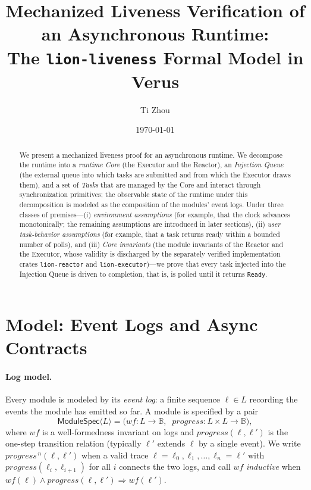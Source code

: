 \documentclass[11pt]{article}
\title{Mechanized Liveness Verification of an Asynchronous Runtime:\\
       The \texttt{lion-liveness} Formal Model in Verus}
\author{Ti Zhou}
\date{\today}
\theoremstyle{plain}
\theoremstyle{definition}
\begin{document}
\maketitle

\begin{abstract}
We present a mechanized liveness proof for an asynchronous runtime. We decompose
the runtime into a \emph{runtime Core} (the Executor and the Reactor), an
\emph{Injection Queue} (the external queue into which tasks are submitted and from
which the Executor draws them), and a set of \emph{Tasks} that are managed by the
Core and interact through synchronization primitives; the observable state of the
runtime under this decomposition is modeled as the composition of the modules'
event logs. Under three classes of premises---(i) \emph{environment assumptions}
(for example, that the clock advances monotonically; the remaining assumptions are
introduced in later sections), (ii) \emph{user task-behavior assumptions} (for
example, that a task returns ready within a bounded number of polls), and (iii)
\emph{Core invariants} (the module invariants of the Reactor and the Executor,
whose validity is discharged by the separately verified implementation crates
\texttt{lion-reactor} and \texttt{lion-executor})---we prove that every task
injected into the Injection Queue is driven to completion, that is, is polled
until it returns \texttt{Ready}.
\end{abstract}

\tableofcontents
\bigskip


\section{Model: Event Logs and Async Contracts}
\label{sec:model}

\paragraph{Log model.}
Every module is modeled by its \emph{event log}: a finite sequence $\ell \in L$
recording the events the module has emitted so far. A module is specified by a pair
\[
  \mathsf{ModuleSpec}\langle L\rangle
  = \bigl(\mathit{wf} : L \to \mathbb{B},\;\; \mathit{progress} : L \times L \to \mathbb{B}\bigr),
\]
where $\mathit{wf}$ is a well-formedness invariant on logs and $\mathit{progress}(\ell,\ell')$
is the one-step transition relation (typically $\ell'$ extends $\ell$ by a single event).
We write $\mathit{progress}^{\,n}(\ell,\ell')$ when a valid trace
$\ell = \ell_0, \ell_1, \dots, \ell_n = \ell'$ with $\mathit{progress}(\ell_i,\ell_{i+1})$ for
all $i$ connects the two logs, and call $\mathit{wf}$ \emph{inductive} when
$\mathit{wf}(\ell) \wedge \mathit{progress}(\ell,\ell') \Rightarrow \mathit{wf}(\ell')$.
\end{document}
